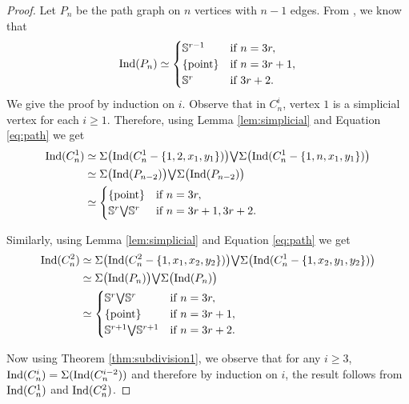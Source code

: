 \documentclass[12pt]{article}
\numberwithin{thm}{section}
\theoremstyle{definition}
\newcommand{\bS}{\mathbb{S}}
\newcommand{\ind}{{\rm{Ind}}}
\begin{document}
\begin{proof}
    Let $P_n$ be the path graph on $n$ vertices with $n-1$ edges.  From \cite[Proposition 11.16]{dk}, we know that
     \begin{equation} \label{eq:path}
		 \ind(P_n) \simeq 
		\begin{cases}
		\bS^{r-1} & \text{if } n=3r, \\
		\{\text{point}\} & \text{if } n=3r+1, \\
		\bS^{r} & \text{if } 3r+2. 
		\end{cases}
	\end{equation}
 We give the proof  by induction on $i$. Observe that in $C_{n}^{i}$, vertex $1$ is a simplicial vertex for each $i \geq 1$. Therefore, using Lemma \ref{lem:simplicial} and Equation \ref{eq:path} we get 
		\begin{align*}
	\ind(C_{n}^{1}) & \simeq \Sigma \big(\ind(C_{n}^{1} -\{1,2,x_1,y_1\})\big) {\textstyle \bigvee} \Sigma \big(\ind(C_{n}^{1} -\{1,n,x_1,y_1\})\big) \\
	& \simeq \Sigma \big(\ind(P_{n-2})\big) {\textstyle \bigvee} \Sigma\big(\ind(P_{n-2})\big) \\
	& \simeq \begin{cases}\{\text{point}\}  & \text{if } n=3r,\\
	\bS^r {\textstyle \bigvee} \bS^r & \text{if } n=3r+ 1,3r+2.
	\end{cases}
	\end{align*}
	
	Similarly, using Lemma \ref{lem:simplicial} and Equation \ref{eq:path} we get
	 \begin{align*}
	\ind(C_{n}^{2}) & \simeq \Sigma \big(\ind(C_{n}^{2} -\{1,x_1,x_2,y_2\})\big) {\textstyle \bigvee} \Sigma\big(\ind(C_{n}^{1} -\{1,x_2,y_1,y_2\})\big) \\
	& \simeq \Sigma\big(\ind(P_{n})\big) {\textstyle \bigvee} \Sigma\big(\ind(P_{n})\big) \\
	& \simeq 
	\begin{cases}
	\bS^r {\textstyle \bigvee} \bS^r & \text{if } n=3r,\\
	\{\text{point}\} & \text{if } n=3r+1, \\
	\bS^{r+1} {\textstyle \bigvee} \bS^{r+1} & \text{if } n=3r+2.
	\end{cases}
	\end{align*}
	
	Now using Theorem \ref{thm:subdivision1}, we observe that for any $i \geq 3$, $\ind(C_{n}^{i}) = \Sigma(\ind(C_{n}^{i-2}))$ and therefore by induction on $i$, the result follows from $\ind(C_n^{1})$ and $\ind(C_n^2)$.
\end{proof}
\end{document}

